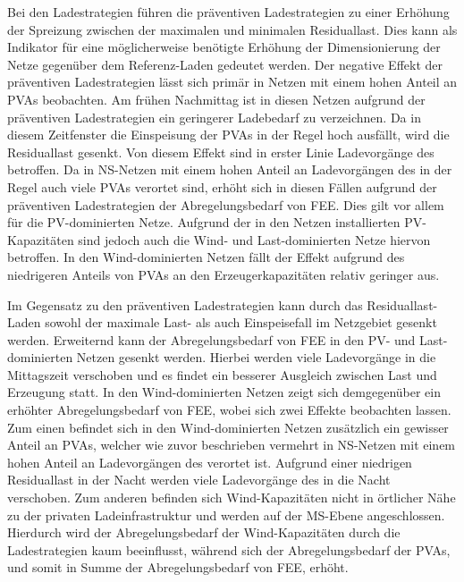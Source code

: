 Bei den Ladestrategien führen die präventiven Ladestrategien zu einer Erhöhung der Spreizung zwischen der maximalen und minimalen Residuallast.
Dies kann als Indikator für eine möglicherweise benötigte Erhöhung der Dimensionierung der Netze gegenüber dem Referenz-Laden gedeutet werden.
Der negative Effekt der präventiven Ladestrategien lässt sich primär in Netzen mit einem hohen Anteil an \glspl{PVA} beobachten.
Am frühen Nachmittag ist in diesen Netzen aufgrund der präventiven Ladestrategien ein geringerer Ladebedarf zu verzeichnen.
Da in diesem Zeitfenster die Einspeisung der \glspl{PVA} in der Regel hoch ausfällt, wird die Residuallast gesenkt.
Von diesem Effekt sind in erster Linie Ladevorgänge des \UC \zH betroffen.
Da in \gls{NS}-Netzen mit einem hohen Anteil an Ladevorgängen des \UC \zH in der Regel auch viele \glspl{PVA} verortet sind, erhöht sich in diesen Fällen aufgrund der präventiven Ladestrategien der Abregelungsbedarf von \gls{FEE}.
Dies gilt vor allem für die \gls{PV}-dominierten Netze.
Aufgrund der in den Netzen installierten \gls{PV}-Kapazitäten sind jedoch auch die Wind- und Last-dominierten Netze hiervon betroffen.
In den Wind-dominierten Netzen fällt der Effekt aufgrund des niedrigeren Anteils von \glspl{PVA} an den Erzeugerkapazitäten relativ geringer aus.\medskip

Im Gegensatz zu den präventiven Ladestrategien kann durch das Residuallast-Laden sowohl der maximale Last- als auch Einspeisefall im Netzgebiet gesenkt werden.
Erweiternd kann der Abregelungsbedarf von \gls{FEE} in den \gls{PV}- und Last-dominierten Netzen gesenkt werden.
Hierbei werden viele Ladevorgänge in die Mittagszeit verschoben und es findet ein besserer Ausgleich zwischen Last und Erzeugung statt.
In den Wind-dominierten Netzen zeigt sich demgegenüber ein erhöhter Abregelungsbedarf von \gls{FEE}, wobei sich zwei Effekte beobachten lassen.
Zum einen befindet sich in den Wind-dominierten Netzen zusätzlich ein gewisser Anteil an \glspl{PVA}, welcher wie zuvor beschrieben vermehrt in \gls{NS}-Netzen mit einem hohen Anteil an Ladevorgängen des \UC \zH verortet ist.
Aufgrund einer niedrigen Residuallast in der Nacht werden viele Ladevorgänge des \UC \zH in die Nacht verschoben.
Zum anderen befinden sich Wind-Kapazitäten nicht in örtlicher Nähe zu der privaten Ladeinfrastruktur und werden auf der \gls{MS}-Ebene angeschlossen.
Hierdurch wird der Abregelungsbedarf der Wind-Kapazitäten durch die Ladestrategien kaum beeinflusst, während sich der Abregelungsbedarf der \glspl{PVA}, und somit in Summe der Abregelungsbedarf von \gls{FEE}, erhöht.\medskip

